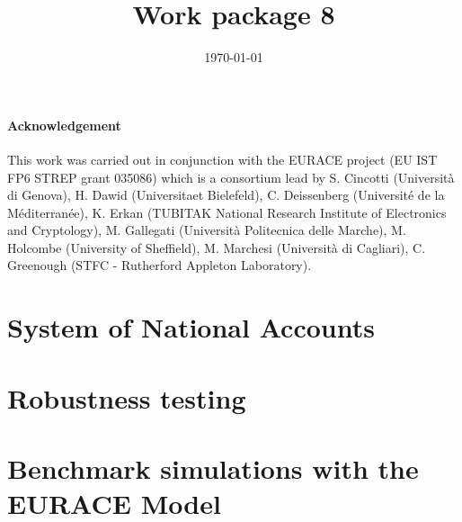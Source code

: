 \documentclass[a4paper,11pt]{book}
\begin{document}
\title{Work package 8}
\author{}
\date{\today}
\maketitle
\tableofcontents

\subsubsection*{Acknowledgement}
This work was carried out in conjunction with the EURACE project (EU IST FP6
STREP grant 035086) which is a consortium lead by S. Cincotti (Universit\`{a} di
Genova), H. Dawid (Universitaet Bielefeld), C. Deissenberg (Universit\'{e} de la
M\'{e}diterran\'{e}e), K. Erkan (TUBITAK National Research Institute of Electronics
and Cryptology), M. Gallegati  (Universit\`{a} Politecnica delle Marche), M.
Holcombe (University of Sheffield), M. Marchesi (Universit\`{a} di Cagliari), C.
Greenough (STFC - Rutherford Appleton Laboratory).


\chapter{System of National Accounts}


%



\chapter{Robustness testing}
%

\chapter{Benchmark simulations with the EURACE Model}


\begin{appendix}

\end{appendix}
\end{document}
